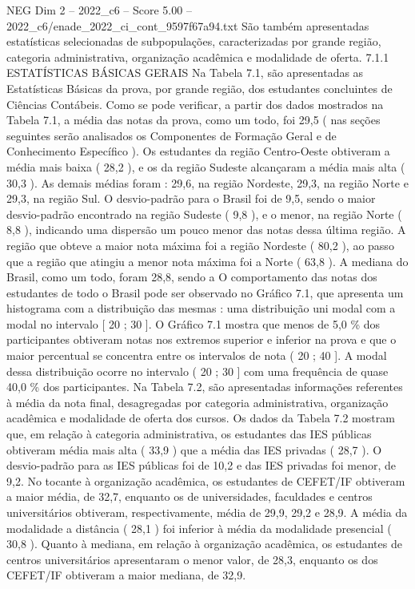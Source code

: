 \begin{textsample}{NEG Dim 2 – 2022\_c6 – Score 5.00 – 2022\_c6/enade\_2022\_ci\_cont\_9597f67a94.txt}
São também apresentadas estatísticas selecionadas de subpopulações, caracterizadas por grande região, categoria administrativa, organização acadêmica e modalidade de oferta. 7.1.1 ESTATÍSTICAS BÁSICAS GERAIS Na Tabela 7.1, são apresentadas as Estatísticas Básicas da prova, por grande região, dos estudantes concluintes de Ciências Contábeis.
Como se pode verificar, a partir dos dados mostrados na Tabela 7.1, a média das notas da prova, como um todo, foi 29,5 ( nas seções seguintes serão analisados os Componentes de Formação Geral e de Conhecimento Específico ).
Os estudantes da região Centro-Oeste obtiveram a média mais baixa ( 28,2 ), e os da região Sudeste alcançaram a média mais alta ( 30,3 ).
As demais médias foram : 29,6, na região Nordeste, 29,3, na região Norte e 29,3, na região Sul.
O desvio-padrão para o Brasil foi de 9,5, sendo o maior desvio-padrão encontrado na região Sudeste ( 9,8 ), e o menor, na região Norte ( 8,8 ), indicando uma dispersão um pouco menor das notas dessa última região.
A região que obteve a maior nota máxima foi a região Nordeste ( 80,2 ), ao passo que a região que atingiu a menor nota máxima foi a Norte ( 63,8 ).
A mediana do Brasil, como um todo, foram 28,8, sendo a O comportamento das notas dos estudantes de todo o Brasil pode ser observado no Gráfico 7.1, que apresenta um histograma com a distribuição das mesmas : uma distribuição uni modal com a modal no intervalo [ 20 ; 30 ].
O Gráfico 7.1 mostra que menos de 5,0 \% dos participantes obtiveram notas nos extremos superior e inferior na prova e que o maior percentual se concentra entre os intervalos de nota ( 20 ; 40 ].
A modal dessa distribuição ocorre no intervalo ( 20 ; 30 ] com uma frequência de quase 40,0 \% dos participantes.
Na Tabela 7.2, são apresentadas informações referentes à média da nota final, desagregadas por categoria administrativa, organização acadêmica e modalidade de oferta dos cursos.
Os dados da Tabela 7.2 mostram que, em relação à categoria administrativa, os estudantes das IES públicas obtiveram média mais alta ( 33,9 ) que a média das IES privadas ( 28,7 ).
O desvio-padrão para as IES públicas foi de 10,2 e das IES privadas foi menor, de 9,2.
No tocante à organização acadêmica, os estudantes de CEFET/IF obtiveram a maior média, de 32,7, enquanto os de universidades, faculdades e centros universitários obtiveram, respectivamente, média de 29,9, 29,2 e 28,9.
A média da modalidade a distância ( 28,1 ) foi inferior à média da modalidade presencial ( 30,8 ).
Quanto à mediana, em relação à organização acadêmica, os estudantes de centros universitários apresentaram o menor valor, de 28,3, enquanto os dos CEFET/IF obtiveram a maior mediana, de 32,9.

\end{textsample}
